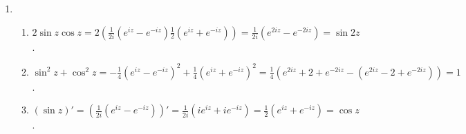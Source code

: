 \documentclass[11pt, letterpaper]{article}
\begin{document}
\begin{enumerate}
  \item \begin{enumerate}
    \item 
      $2 \sin z \cos z
      = 2 \left( \frac{1}{2i} (e^{iz} - e^{-iz}) \frac{1}{2} (e^{iz} + e^{-iz}) \right)
      = \frac{1}{2i}(e^{2iz} - e^{-2iz})
      = \sin 2z$.

    \item
      $\sin^2 z + \cos^2 z
      = -\frac{1}{4} (e^{iz} - e^{-iz})^2 + \frac{1}{4} (e^{iz} + e^{-iz})^2
      = \frac{1}{4}(e^{2iz} + 2 + e^{-2iz} - (e^{2iz} - 2 + e^{-2iz}))
      = 1$.

    \item $
      (\sin z)' = \left(\frac{1}{2i}(e^{iz} - e^{-iz}) \right)'
      = \frac{1}{2i} (ie^{iz} + ie^{-iz})
      = \frac{1}{2} (e^{iz} + e^{-iz})
      = \cos z$.
  \end{enumerate}

  
\end{enumerate}
\end{document}
